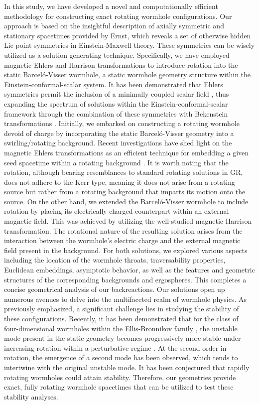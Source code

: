 \documentclass[aps,preprint,groupedaddress,nofootinbib,superscriptaddress,showkeys,showpacs,eqsecnum,amsmath,amssymb]{revtex4-1}
\begin{document}
In this study, we have developed a novel and computationally efficient methodology for constructing exact rotating wormhole configurations. Our approach is based on the insightful description of axially symmetric and stationary spacetimes provided by Ernst, which reveals a set of otherwise hidden Lie point symmetries in Einstein-Maxwell theory. These symmetries can be wisely utilized as a solution generating technique. Specifically, we have employed magnetic Ehlers and Harrison transformations to introduce rotation into the static Barcel\'o-Visser wormhole, a static wormhole geometry structure within the Einstein-conformal-scalar system. It has been demonstrated that Ehlers symmetries permit the inclusion of a minimally coupled scalar field \cite{Astorino:2013xc} , thus expanding the spectrum of solutions within the Einstein-conformal-scalar framework through the combination of these symmetries with Bekenstein transformations \cite{Bekenstein:1974sf}. Initially, we embarked on constructing a rotating wormhole devoid of charge by incorporating the static Barcel\'o-Visser geometry into a swirling/rotating background. Recent investigations have shed light on the magnetic Ehlers transformations as an efficient technique for embedding a given seed spacetime within a rotating background \cite{Astorino:2022aam}. It is worth noting that the rotation, although bearing resemblances to standard rotating solutions in GR, does not adhere to the Kerr type, meaning it does not arise from a rotating source but rather from a rotating background that imparts its motion onto the source.
On the other hand, we extended the Barcel\'o-Visser wormhole to include rotation by placing its electrically charged counterpart \cite{Barrientos:2022avi} within an external magnetic field. This was achieved by utilizing the well-studied magnetic Harrison transformation. The rotational nature of the resulting solution arises from the interaction between the wormhole's electric charge and the external magnetic field present in the background. For both solutions, we explored various aspects including the location of the wormhole throats, traversability properties, Euclidean embeddings, asymptotic behavior, as well as the features and geometric structures of the corresponding backgrounds and ergospheres. This completes a concise geometrical analysis of our backreactions. 
Our solutions open up numerous avenues to delve into the multifaceted realm of wormhole physics. As previously emphasized, a significant challenge lies in studying the stability of these configurations. Recently, it has been demonstrated that for the class of four-dimensional wormholes within the Ellis-Bronnikov family \cite{Ellis:1973yv,Bronnikov:1973fh}, the unstable mode present in the static geometry becomes progressively more stable under increasing rotation within a perturbative regime \cite{Azad:2023iju}. At the second order in rotation, the emergence of a second mode has been observed, which tends to intertwine with the original unstable mode. It has been conjectured that rapidly rotating wormholes could attain stability. Therefore, our geometries provide exact, fully rotating wormhole spacetimes that can be utilized to test these stability analyses.
\end{document}
